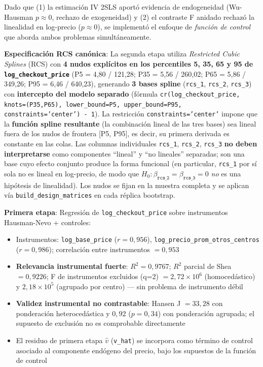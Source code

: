 \documentclass[doc, a4paper, biblatex, floatsintext, longtable, babel]{apa7}
\begin{document}
Dado que (1) la estimación IV 2SLS aportó evidencia de endogeneidad (Wu-Hausman $p \approx0$, rechazo de exogeneidad) y (2) el contraste F anidado rechazó la linealidad en log-precio ($p \approx0$), se implementó el enfoque de \textit{función de control} \parencite{wooldridge2015control} que aborda ambos problemas simultáneamente.

\textbf{Especificación RCS canónica}: La segunda etapa utiliza \textit{Restricted Cubic Splines} (RCS) con \textbf{4 nudos explícitos en los percentiles 5, 35, 65 y 95 de \texttt{log\_checkout\_price}} (P5 = 4,80 / 121,28; P35 = 5,56 / 260,02; P65 = 5,86 / 349,26; P95 = 6,46 / 640,23), generando \textbf{3 bases spline} (\texttt{rcs\_1}, \texttt{rcs\_2}, \texttt{rcs\_3}) con \textbf{intercepto del modelo separado} (fórmula \texttt{cr(log\_checkout\_price, knots=(P35,P65), lower\_bound=P5, upper\_bound=P95, constraints='center') - 1}). La restricción \texttt{constraints='center'} impone que la \textbf{función spline resultante} (la combinación lineal de las tres bases) sea lineal fuera de los nudos de frontera [P5, P95], es decir, su primera derivada es constante en las colas. Las columnas individuales \texttt{rcs\_1}, \texttt{rcs\_2}, \texttt{rcs\_3} \textbf{no deben interpretarse} como componentes ``lineal'' y ``no lineales'' separadas; son una base cuyo efecto conjunto produce la forma funcional (en particular, \texttt{rcs\_1} por sí sola no es lineal en log-precio, de modo que $H_0:\beta_{\texttt{rcs\_2}}=\beta_{\texttt{rcs\_3}}=0$ \emph{no} es una hipótesis de linealidad). Los nudos se fijan en la muestra completa y se aplican vía \texttt{build\_design\_matrices} en cada réplica bootstrap.

\textbf{Primera etapa}: Regresión de \texttt{log\_checkout\_price} sobre instrumentos Hausman-Nevo + controles:
\begin{itemize}
    \item Instrumentos: \texttt{log\_base\_price} ($r=0,956$), \texttt{log\_precio\_prom\_otros\_centros} ($r=0,986$); correlación entre instrumentos $=0,953$
    \item \textbf{Relevancia instrumental fuerte}: $R^2 = 0,9767$; $R^2$ parcial de Shea $=0,9226$; F de instrumentos excluidos (q=2) $= 2,72 \times 10^6$ (homocedástico) y $2,18 \times 10^5$ (agrupado por centro) --- sin problema de instrumento débil
    \item \textbf{Validez instrumental no contrastable}: Hansen J $=33,28$ con ponderación heterocedástica y $0,92$ ($p=0,34$) con ponderación agrupada; el supuesto de exclusión no es comprobable directamente
    \item El residuo de primera etapa $\hat{v}$ (\texttt{v\_hat}) se incorpora como término de control asociado al componente endógeno del precio, bajo los supuestos de la función de control
\end{itemize}
\end{document}
